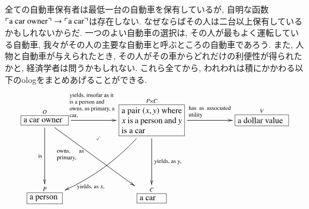 \begin{example}


全ての自動車保有者は最低一台の自動車を保有しているが, 自明な函数$\textrm{$\ulcorner$a car owner$\urcorner$}\rightarrow\textrm{$\ulcorner$a car$\urcorner$}$は存在しない. なぜならばその人は二台以上保有しているかもしれないからだ. 一つのよい自動車の選択は, その人が最もよく運転している自動車, 我々がその人の主要な自動車と呼ぶところの自動車であろう. また, 人物と自動車が与えられたとき, その人がその車からどれだけの利便性が得られたかと, 経済学者は問うかもしれない. これら全てから, われわれは積にかかわる以下のologをまとめあげることができる.
$$
\xymatrixnocompile{\obox{O}{.7in}{a car owner}\LAL{dd}{is}\ar[ddrr]_(.35){\parbox{.45in}{\scriptsize owns, as primary,}}\LA{rr}{\parbox{.8in}{\rr\scriptsize yields, insofar as it is a person and owns, as primary, a car,}}&\ar@{}[d]^(.4){\checkmark}&
\obox{P\times C}{1in}{a pair $(x,y)$ where $x$ is a person and $y$ is a car}\ar@/^1pc/[ddll]^(.7){\tn{yields, as }x,}\LA{dd}{\tn{yields, as }y,}\LA{rr}{\parbox{.7in}{\scriptsize has as associated utility}}&&\obox{V}{.8in}{a dollar value}\\&&\\\obox{P}{.5in}{a person}&&\obox{C}{.4in}{a car}
}
$$

\end{example}


